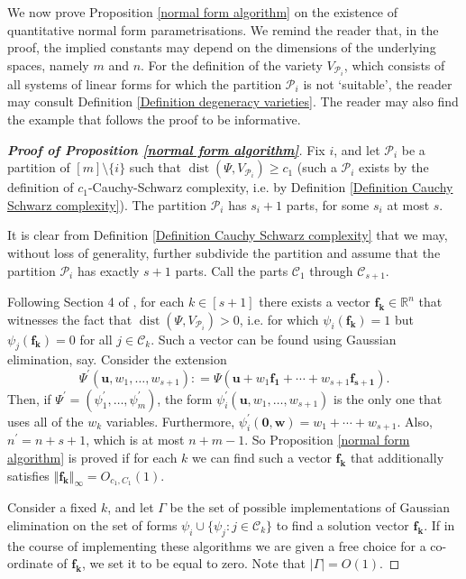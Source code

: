 \documentclass[12pt,a4paper,twoside,reqno]{amsart}
\numberwithin{equation}{section}
\begin{document}
We now prove Proposition \ref{normal form algorithm} on the existence of quantitative normal form parametrisations. We remind the reader that, in the proof, the implied constants may depend on the dimensions of the underlying spaces, namely $m$ and $n$. For the definition of the variety $V_{\mathcal{P}_i}$, which consists of all systems of linear forms for which the partition $\mathcal{P}_i$ is not `suitable', the reader may consult Definition \ref{Definition degeneracy varieties}. The reader may also find the example that follows the proof to be informative. 

\begin{proof}[\textbf{Proof of \emph{Proposition \ref{normal form algorithm}}}]
Fix $i$, and let $\mathcal{P}_i$ be a partition of $[m]\setminus \{i\}$ such that $\operatorname{dist}(\Psi, V_{\mathcal{P}_i})\geqslant c_1$ (such a $\mathcal{P}_i$ exists by the definition of $c_1$-Cauchy-Schwarz complexity, i.e. by Definition \ref{Definition Cauchy Schwarz complexity}). The partition $\mathcal{P}_i$ has $s_i+1$ parts, for some $s_i$ at most $s$. 

It is clear from Definition \ref{Definition Cauchy Schwarz complexity} that we may, without loss of generality, further subdivide the partition and assume that the partition $\mathcal{P}_i$ has exactly $s+1$ parts. Call the parts $\mathcal{C}_1$ through $\mathcal{C}_{s+1}$. 

Following Section 4 of \cite{GT10}, for each $k\in [s+1]$ there exists a vector $\mathbf{f_k}\in \mathbb{R}^n$ that witnesses the fact that $ \operatorname{dist}(\Psi, V_{\mathcal{P}_i})>0$, i.e. for which $\psi_i(\mathbf{f_k}) = 1$ but $\psi_j(\mathbf{f_k})=0$ for all $j\in \mathcal{C}_k$. Such a vector can be found using Gaussian elimination, say. Consider the extension $$\Psi^\prime(\mathbf{u}, w_1,\dots,w_{s+1}): = \Psi(\mathbf{u} + w_1\mathbf{f_1}+ \cdots + w_{s+1}\mathbf{f_{s+1}}).$$ Then, if $\Psi^\prime = (\psi_1^\prime, \dots, \psi_m^\prime)$, the form $\psi^\prime_i(\mathbf{u},w_1,\dots,w_{s+1})$ is the only one that uses all of the $w_k$ variables. Furthermore, $\psi_i^\prime (\mathbf{0},\mathbf{w})= w_1 + \cdots + w_{s+1}$. Also, $n^\prime = n+ s+1$, which is at most $n+m-1$. So Proposition \ref{normal form algorithm} is proved if for each $k$ we can find such a vector $\mathbf{f_k}$ that additionally satisfies $\Vert\mathbf{f_k}\Vert_\infty = O_{c_1,C_1}(1)$. 

Consider a fixed $k$, and let $\Gamma$ be the set of possible implementations of Gaussian elimination on the set of forms $\psi_i \cup \{\psi_j: j\in \mathcal{C}_k\}$ to find a solution vector $\mathbf{f_k}$. If in the course of implementing these algorithms we are given a free choice for a co-ordinate of $\mathbf{f_k}$, we set it to be equal to zero. Note that $\vert \Gamma\vert = O(1)$.


\end{proof}
\end{document}
